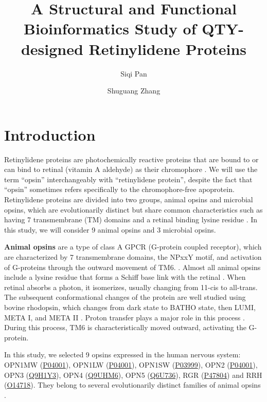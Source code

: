 \documentclass[fleqn,10pt]{manuscript}
\title{A Structural and Functional Bioinformatics Study of QTY-designed Retinylidene Proteins}
\author[1]{Siqi Pan}
\author[2]{Shuguang Zhang}
\affil[1]{Shanghai World Foreign Language Academy, 400 Baihua Street, Shanghai 200233, China}
\affil[2]{Lab of Molecular Architecture, Media Lab, Massachusetts Institute of Technology, 77 Massachusetts Avenue, Cambridge, MA 02139, USA}
\begin{document}
\flushbottom
\maketitle
\thispagestyle{empty}

\section*{Introduction}

Retinylidene proteins are photochemically reactive proteins that are bound to or can bind to retinal (vitamin A aldehyde) as their chromophore \citep{Spudich_2000}. We will use the term ``opsin'' interchangeably with ``retinylidene protein'', despite the fact that ``opsin'' sometimes refers specifically to the chromophore-free apoprotein. Retinylidene proteins are divided into two groups, animal opsins and microbial opsins, which are evolutionarily distinct but share common characteristics such as having 7 transmembrane (TM) domains and a retinal binding lysine residue \citep{Yee_2013, Spudich_2000}. In this study, we will consider 9 animal opsins and 3 microbial opsins. 

\textbf{Animal opsins} are a type of class A GPCR (G-protein coupled receptor), which are characterized by 7 transmembrane domains, the NPxxY motif, and activation of G-proteins through the outward movement of TM6. \citep{Sakmar_2002, Nordstrom_2011, Zhou_2019}. Almost all animal opsins include a lysine residue that forms a Schiff base link with the retinal \citep{Bownds_1967, Guhmann_2022}. When retinal absorbs a photon, it isomerizes, usually changing from 11-cis to all-trans. The subsequent conformational changes of the protein are well studied using bovine rhodopsin, which changes from dark state to BATHO state, then LUMI, META I, and META II \citep{Okada_2001, Smith_2010}. Proton transfer plays a major role in this process \citep{Mahalingam_2008}. During this process, TM6 is characteristically moved outward, activating the G-protein. 

In this study, we selected 9 opsins expressed in the human nervous system: OPN1MW (\href{https://www.uniprot.org/uniprotkb/P04001/entry}{P04001}), OPN1LW (\href{https://www.uniprot.org/uniprotkb/P04000/entry}{P04001}), OPN1SW (\href{https://www.uniprot.org/uniprotkb/P03999/entry}{P03999}), OPN2 (\href{https://www.uniprot.org/uniprotkb/P08100/entry}{P04001}), OPN3 (\href{https://www.uniprot.org/uniprotkb/Q9H1Y3/entry}{Q9H1Y3}), OPN4 (\href{https://www.uniprot.org/uniprotkb/Q9UHM6/entry}{Q9UHM6}), OPN5 (\href{https://www.uniprot.org/uniprotkb/Q6U736/entry}{Q6U736}), RGR (\href{https://www.uniprot.org/uniprotkb/P47804/entry}{P47804}) and RRH (\href{https://www.uniprot.org/uniprotkb/O14718/entry}{O14718}). They belong to several evolutionarily distinct families of animal opsins \citep{Terakita_2005, Shichida_2009}. 
\end{document}
